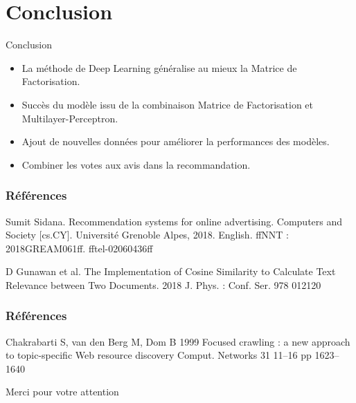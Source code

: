 \documentclass[xelatex,12pt]{beamer}
\begin{document}
\section{Conclusion}
\begin{frame}{Conclusion}
  \begin{itemize}
 \item La méthode de Deep Learning généralise au mieux la Matrice de Factorisation.
 \item Succès du modèle issu de la combinaison Matrice de Factorisation et Multilayer-Perceptron.
 \item Ajout de nouvelles données pour améliorer la performances des modèles.
 \item Combiner les votes aux avis dans la recommandation.
  
  \end{itemize}
  \end{frame}

\begin{frame}
\frametitle{Références}
\begin{thebibliography}{9}
Sumit Sidana. Recommendation systems for online advertising. Computers and Society [cs.CY].
Université Grenoble Alpes, 2018. English. ffNNT : 2018GREAM061ff. fftel-02060436ff

D Gunawan et al. The Implementation of Cosine Similarity to Calculate Text Relevance between Two Documents. 2018 J. Phys. : Conf. Ser. 978 012120



\end{thebibliography}
\end{frame}


\begin{frame}

\frametitle{Références}
\begin{thebibliography}{9}
Chakrabarti S, van den Berg M, Dom B 1999 Focused crawling : a new approach to topic-specific Web resource discovery Comput. Networks 31 11–16 pp 1623–1640

\end{thebibliography}
\end{frame}

\begin{frame}
  \begin{block}{}
  \centering
  Merci pour votre attention
  \end{block}
\end{frame}
\end{document}

